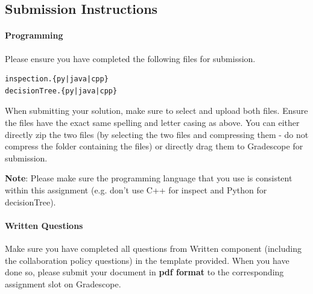 \documentclass[11pt,addpoints,answers]{exam}
\begin{document}

    
\subsection{Submission Instructions}

\paragraph{Programming}
Please ensure you have completed the following files for submission.


\begin{verbatim}
inspection.{py|java|cpp}
decisionTree.{py|java|cpp}
\end{verbatim}

When submitting your solution, make sure to select and upload both files. Ensure the files have the exact same spelling and letter casing as above. You can either directly zip the two files (by selecting the two files and compressing them - do not compress the folder containing the files) or directly drag them to Gradescope for submission.


\textbf{Note}: Please make sure the programming language that you use is consistent within this assignment (e.g. don't use C++ for inspect and Python for decisionTree).

\paragraph{Written Questions}
Make sure you have completed all questions from Written component (including the collaboration policy questions) in the template provided.  When you have done so, please submit your document in \textbf{pdf format} to the corresponding assignment slot on Gradescope.



\newpage
\end{document}
